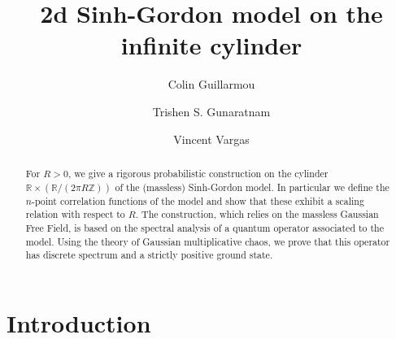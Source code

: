 \documentclass[11pt]{amsart}
\author{Colin Guillarmou}
\author{Trishen S. Gunaratnam}
\author{Vincent Vargas}
\title{2d Sinh-Gordon model on the infinite cylinder}
\numberwithin{equation}{section}
\theoremstyle{definition}
\newcommand{\R}{\mathbb{R}}
\newcommand{\Z}{\mathbb{Z}}
\begin{document}
 
 \begin{abstract}
For  $R>0$, we give a rigorous probabilistic construction on the cylinder $\R \times (\R/ (2\pi R \Z))$  of the (massless) Sinh-Gordon model. In particular we define the $n$-point correlation functions of the model and show that these exhibit a scaling relation with respect to $R$. The construction, which relies on the massless Gaussian Free Field, is based on the spectral analysis of a quantum operator associated to the model. Using the theory of Gaussian multiplicative chaos, we prove that this operator has discrete spectrum and a strictly positive ground state. 
 \end{abstract}
 
 \maketitle
 




\normalsize






\section{Introduction}
\end{document}
